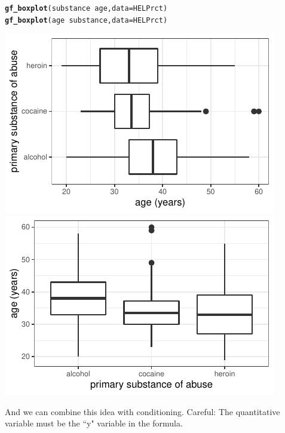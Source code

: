\documentclass[twoside]{book}\usepackage[]{graphicx}\usepackage[]{xcolor}
\makeatletter
\def\maxwidth{ %
  \ifdim\Gin@nat@width>\linewidth
    \linewidth
  \else
    \Gin@nat@width
  \fi
}
\newcommand{\hlopt}[1]{\textcolor[rgb]{0,0,0}{#1}}%
\newcommand{\hlstd}[1]{\textcolor[rgb]{0.345,0.345,0.345}{#1}}%
\newcommand{\hlkwc}[1]{\textcolor[rgb]{0.333,0.667,0.333}{#1}}%
\newcommand{\hlkwd}[1]{\textcolor[rgb]{0.737,0.353,0.396}{\textbf{#1}}}%
\newenvironment{kframe}{%
 \def\at@end@of@kframe{}%
 \ifinner\ifhmode%
  \def\at@end@of@kframe{\end{minipage}}%
  \begin{minipage}{\columnwidth}%
 \fi\fi%
 \def\FrameCommand##1{\hskip\@totalleftmargin \hskip-\fboxsep
 \colorbox{shadecolor}{##1}\hskip-\fboxsep
     \hskip-\linewidth \hskip-\@totalleftmargin \hskip\columnwidth}%
 \MakeFramed {\advance\hsize-\width
   \@totalleftmargin\z@ \linewidth\hsize
   \@setminipage}}%
 {\par\unskip\endMakeFramed%
 \at@end@of@kframe}
\newenvironment{knitrout}{}{} %
\makeatother
\begin{document}
\begin{knitrout}
\color{fgcolor}\begin{kframe}
\begin{alltt}
\hlkwd{gf_boxplot}\hlstd{(substance} \hlopt{~} \hlstd{age,} \hlkwc{data}\hlstd{=HELPrct)}
\hlkwd{gf_boxplot}\hlstd{(age} \hlopt{~} \hlstd{substance,} \hlkwc{data}\hlstd{=HELPrct)}
\end{alltt}
\end{kframe}

{\centering \includegraphics[width=\maxwidth]{figures/fig-bwplot2-1} 
\includegraphics[width=\maxwidth]{figures/fig-bwplot2-2} 

}



\end{knitrout}

And we can combine this idea with conditioning. Careful: The quantitative variable must be the ``y" variable in the formula.
\end{document}
